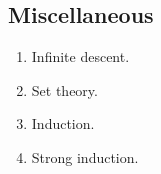 \documentclass{article}
\begin{document}
\subsection*{Miscellaneous}
\begin{enumerate}
\item[\underline{\hspace{0.4cm}}] Infinite descent.
\item[\underline{\hspace{0.4cm}}] Set theory.
\item[\underline{\hspace{0.4cm}}] Induction.
\item[\underline{\hspace{0.4cm}}] Strong induction.
\end{enumerate}
\end{document}
